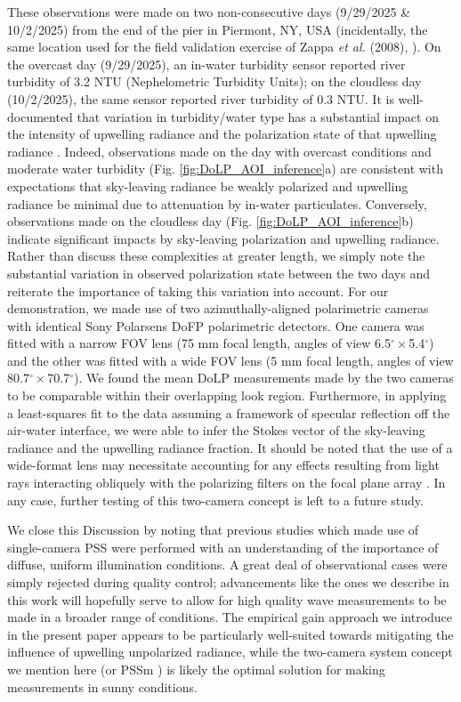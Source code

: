 \documentclass[letterpaper,draftcls,onecolumn]{IEEEtran}
\begin{document}
These observations were made on two non-consecutive days (9/29/2025 \& 10/2/2025) from the end of the pier in Piermont, NY, USA (incidentally, the same location used for the field validation exercise of Zappa \emph{et al.} (2008), \cite{Zappa2008}). On the overcast day (9/29/2025), an in-water turbidity sensor \cite{noauthor_usgs_2025} reported river turbidity of 3.2 NTU (Nephelometric Turbidity Units); on the cloudless day (10/2/2025), the same sensor reported river turbidity of 0.3 NTU. It is well-documented that variation in turbidity/water type has a substantial impact on the intensity of upwelling radiance \cite{gordon_spectra_2009} and the polarization state of that upwelling radiance \cite{chami_radiative_2001,You2011}. Indeed, observations made on the day with overcast conditions and moderate water turbidity (Fig. \ref{fig:DoLP_AOI_inference}a) are consistent with expectations that sky-leaving radiance be weakly polarized and upwelling radiance be minimal due to attenuation by in-water particulates. Conversely, observations made on the cloudless day (Fig. \ref{fig:DoLP_AOI_inference}b) indicate significant impacts by sky-leaving polarization and upwelling radiance. Rather than discuss these complexities at greater length, we simply note the substantial variation in observed polarization state between the two days and reiterate the importance of taking this variation into account. For our demonstration, we made use of two azimuthally-aligned polarimetric cameras with identical Sony Polarsens DoFP polarimetric detectors. One camera was fitted with a narrow FOV lens (75 mm focal length, angles of view 6.5$^{\circ}\times$5.4$^{\circ}$) and the other was fitted with a wide FOV lens (5 mm focal length, angles of view 80.7$^{\circ}\times$70.7$^{\circ}$). We found the mean DoLP measurements made by the two cameras to be comparable within their overlapping look region. Furthermore, in applying a least-squares fit to the data assuming a framework of specular reflection off the air-water interface, we were able to infer the Stokes vector of the sky-leaving radiance and the upwelling radiance fraction. It should be noted that the use of a wide-format lens may necessitate accounting for any effects resulting from light rays interacting obliquely with the polarizing filters on the focal plane array \cite{pistellato_geometric_2024}. In any case, further testing of this two-camera concept is left to a future study.

We close this Discussion by noting that previous studies which made use of single-camera PSS \cite{Zappa2012,Laxague2015,Laxague2018b} were performed with an understanding of the importance of diffuse, uniform illumination conditions. A great deal of observational cases were simply rejected during quality control; advancements like the ones we describe in this work will hopefully serve to allow for high quality wave measurements to be made in a broader range of conditions. The empirical gain approach we introduce in the present paper appears to be particularly well-suited towards mitigating the influence of upwelling unpolarized radiance, while the two-camera system concept we mention here (or PSSm \cite{malinowski_surface_2024}) is likely the optimal solution for making measurements in sunny conditions.
\end{document}
